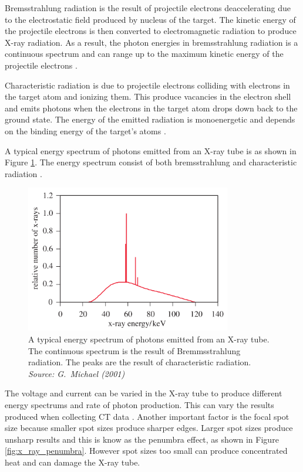 \documentclass[12pt]{report}
\begin{document}
Bremsstrahlung radiation is the result of projectile electrons deaccelerating due to the electrostatic field produced by nucleus of the target. The kinetic energy of the projectile electrons is then converted to electromagnetic radiation to produce X-ray radiation. As a result, the photon energies in bremsstrahlung radiation is  a continuous spectrum and can range up to the maximum kinetic energy of the projectile electrons \cite{michael2001x}.

Characteristic radiation is due to projectile electrons colliding with electrons in the target atom and ionizing them. This produce vacancies in the electron shell and emits photons when the electrons in the target atom drops down back to the ground state. The energy of the emitted radiation is monoenergetic and depends on the binding energy of the target's atoms \cite{michael2001x}.

A typical energy spectrum of photons emitted from an X-ray tube is as shown in Figure \ref{fig:x_ray_spectrum}. The energy spectrum consist of both bremsstrahlung and characteristic radiation \cite{michael2001x}.

\begin{figure}
\centering
\includegraphics[width=0.8\textwidth]{figures/x_ray_spectrum.png}
\caption{A typical energy spectrum of photons emitted from an X-ray tube. The continuous spectrum is the result of Bremmsstrahlung radiation. The peaks are the result of characteristic radiation. \emph{Source: G.~Michael (2001) \cite{michael2001x}}}
\label{fig:x_ray_spectrum}
\end{figure}

The voltage and current can be varied in the X-ray tube to produce different energy spectrums and rate of photon production. This can vary the results produced when collecting CT data \cite{cantatore2011introduction}. Another important factor is the focal spot size because smaller spot sizes produce sharper edges. Larger spot sizes produce unsharp results and this is know as the penumbra effect, as shown in Figure \ref{fig:x_ray_penumbra}. However spot sizes too small can produce concentrated heat \cite{welkenhuyzen2009industrial} and can damage the X-ray tube.
\end{document}
